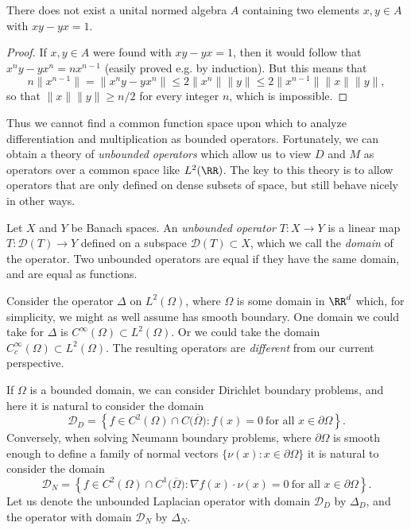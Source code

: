 \begin{lemma}
    There does not exist a unital normed algebra $A$ containing two elements $x,y \in A$ with $xy - yx = 1$.
\end{lemma}
\begin{proof}
    If $x,y \in A$ were found with $xy - yx = 1$, then it would follow that $x^n y - yx^n = nx^{n-1}$ (easily proved e.g. by induction). But this means that
    \[ n \| x^{n-1} \| = \| x^n y - yx^n \| \leq 2 \| x^n \| \| y \| \leq 2 \| x^{n-1} \| \| x \| \| y \|, \]
    so that $\| x \| \| y \| \geq n/2$ for every integer $n$, which is impossible.
\end{proof}

Thus we cannot find a common function space upon which to analyze differentiation and multiplication as bounded operators. Fortunately, we can obtain a theory of \emph{unbounded operators} which allow us to view $D$ and $M$ as operators over a common space like $L^2(\RR)$. The key to this theory is to allow operators that are only defined on dense subsets of space, but still behave nicely in other ways.

Let $X$ and $Y$ be Banach spaces. An \emph{unbounded operator} $T: X \to Y$ is a linear map $T: \mathcal{D}(T) \to Y$ defined on a subspace $\mathcal{D}(T) \subset X$, which we call the \emph{domain} of the operator. Two unbounded operators are equal if they have the same domain, and are equal as functions.

\begin{example}
    Consider the operator $\Delta$ on $L^2(\Omega)$, where $\Omega$ is some domain in $\RR^d$ which, for simplicity, we might as well assume has smooth boundary. One domain we could take for $\Delta$ is $C^\infty(\Omega) \subset L^2(\Omega)$. Or we could take the domain $C_c^\infty(\Omega) \subset L^2(\Omega)$. The resulting operators are \emph{different} from our current perspective.
\end{example}

\begin{example}
    If $\Omega$ is a bounded domain, we can consider Dirichlet boundary problems, and here it is natural to consider the domain
    \[ \mathcal{D}_D = \left\{ f \in C^2(\Omega) \cap C \big( \overline{\Omega} \big) : f(x) = 0\ \text{for all $x \in \partial \Omega$} \right\}. \]
    Conversely, when solving Neumann boundary problems, where $\partial \Omega$ is smooth enough to define a family of normal vectors $\{ \nu(x) : x \in \partial \Omega \}$ it is natural to consider the domain
    \[ \mathcal{D}_N = \left\{ f \in C^2(\Omega) \cap C^1 \big( \overline{\Omega} \big) : \nabla f(x) \cdot \nu(x) = 0\ \text{for all $x \in \partial \Omega$} \right\}. \]
    Let us denote the unbounded Laplacian operator with domain $\mathcal{D}_D$ by $\Delta_D$, and the operator with domain $\mathcal{D}_N$ by $\Delta_N$.
\end{example}

